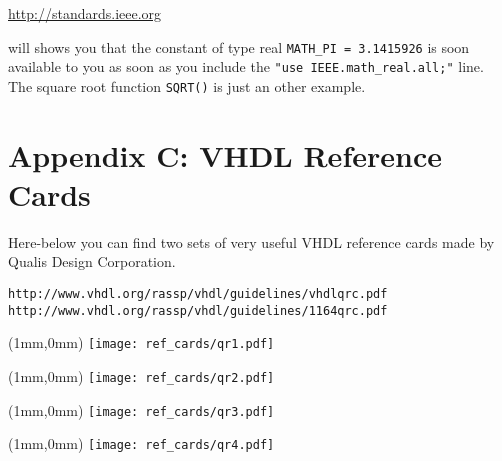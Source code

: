 \url{http://standards.ieee.org} 

will shows you that the constant of type real \texttt{MATH\_PI = 3.1415926} is soon available to you as soon as you include the \texttt{"use IEEE.math\_real.all;"} line. The square root function \texttt{SQRT()} is just an other example.

\chapter{Appendix C: VHDL Reference Cards}
Here-below you can find two sets of very useful VHDL reference cards made by Qualis Design Corporation.

\begin{verbatim}
http://www.vhdl.org/rassp/vhdl/guidelines/vhdlqrc.pdf
http://www.vhdl.org/rassp/vhdl/guidelines/1164qrc.pdf
\end{verbatim}

\newpage\clearpage
\thispagestyle{empty}
\begin{textblock*}{174mm}(1mm,0mm)
\texttt{[image: ref\_cards/qr1.pdf]}
\end{textblock*}
\null\newpage

\thispagestyle{empty}
\begin{textblock*}{174mm}(1mm,0mm)
\texttt{[image: ref\_cards/qr2.pdf]}
\end{textblock*}
\null\newpage

\thispagestyle{empty}
\begin{textblock*}{174mm}(1mm,0mm)
\texttt{[image: ref\_cards/qr3.pdf]}
\end{textblock*}
\null\newpage

\thispagestyle{empty}
\begin{textblock*}{174mm}(1mm,0mm)
\texttt{[image: ref\_cards/qr4.pdf]}
\end{textblock*}
\null\newpage

